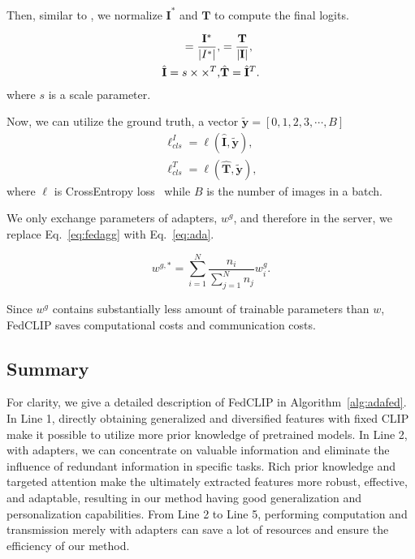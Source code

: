 \documentclass[11pt]{article}
\newcommand{\algorithmname}{Algorithm}
\newcommand{\equationname}{Eq.}
\newcommand{\method}{FedCLIP\xspace}
\newcommand{\wjd}[1]{{\color{cyan}{[(WJD): #1]}}}
\begin{document}
Then, similar to \cite{radford2021learning}, we normalize $\mathbf{I}^*$ and $\mathbf{T}$ to compute the final logits.

\begin{align}
    \title{\mathbf{I}} = \frac{\mathbf{I}^*}{|I^*|}, & \title{\mathbf{T}} = \frac{\mathbf{T}}{|\mathbf{I}|},\\
    \hat{\mathbf{I}}= s \times \title{\mathbf{I}} \times \title{\mathbf{T}}^T,&  \hat{\mathbf{T}}=\hat{\mathbf{I}}^T.
\end{align}
where $s$ is a scale parameter.

Now, we can utilize the ground truth, a vector $\tilde{\mathbf{y}}=[0,1,2,3,\cdots, B]$%
\begin{equation}
\begin{split}
        \ell_{cls}^I= \ell(\hat{\mathbf{I}},\tilde{\mathbf{y}}),\\
    \ell_{cls}^T= \ell(\hat{\mathbf{T}},\tilde{\mathbf{y}}),
\end{split}
\end{equation}
where $\ell$ is CrossEntropy loss~\cite{zhang2018generalized} while $B$ is the number of images in a batch.

We only exchange parameters of adapters, $w^g$, and therefore in the server, we replace \equationname~\ref{eq:fedagg} with \equationname~\ref{eq:ada}.

\begin{equation}
    w^{g,*}=\sum_{i=1}^N \frac{n_i}{\sum_{j=1}^N n_j} w_i^g.
    \label{eq:ada}
\end{equation}

Since $w^g$ contains substantially less amount of trainable parameters than $w$, \method saves computational costs and communication costs.
\subsection{Summary}
For clarity, we give a detailed description of \method in \algorithmname~\ref{alg:adafed}.
In Line 1, directly obtaining generalized and diversified features with fixed CLIP make it possible to utilize more prior knowledge of pretrained models.
In Line 2, with adapters, we can concentrate on valuable information and eliminate the influence of redundant information in specific tasks.
Rich prior knowledge and targeted attention make the ultimately extracted features more robust, effective, and adaptable, resulting in our method having good generalization and personalization capabilities.
From Line 2 to Line 5, performing computation and transmission merely with adapters can save a lot of resources and ensure the efficiency of our method.
\end{document}
